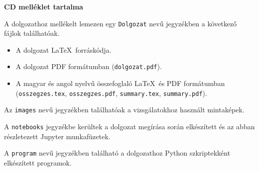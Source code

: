 \pagestyle{empty}

\noindent \textbf{\Large CD melléklet tartalma}

\vskip 1cm

\noindent A dolgozathoz mellékelt lemezen egy \texttt{Dolgozat} nevű jegyzékben a következő fájlok találhatóak.

\begin{itemize}
\item A dolgozat \LaTeX\ forráskódja.
\item A dolgozat PDF formátumban (\texttt{dolgozat.pdf}).
\item A magyar és angol nyelvű összefoglaló \LaTeX\ és PDF formátumban \\ (\texttt{osszegzes.tex}, \texttt{osszegzes.pdf}, \texttt{summary.tex}, \texttt{summary.pdf}).
\end{itemize}

Az \texttt{images} nevű jegyzékben találhatóak a vizsgálatokhoz használt mintaképek.

A \texttt{notebooks} jegyzékbe kerültek a dolgozat megírása során elkészített és az abban részletezett Jupyter munkafüzetek.

A \texttt{program} nevű jegyzékben található a dolgozathoz Python szkriptekként elkészített programok.

